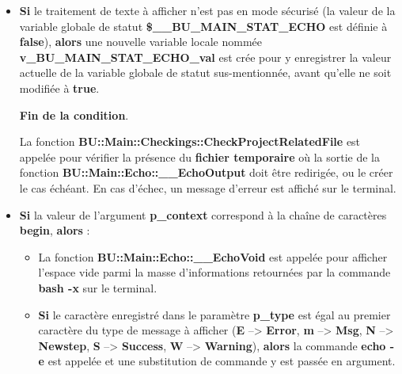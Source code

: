 \documentclass[a4paper,10pt]{article}
\begin{document}
\begin{itemize}
    \item
    {
        \begin{justify}
            \textbf{\color{brick}Si} le traitement de texte à afficher n'est pas en mode sécurisé (la valeur de la variable globale de statut \textbf{\color{orange}\$\_\_BU\_MAIN\_STAT\_ECHO} est définie à \textbf{false}), \textbf{\color{brick}alors} une nouvelle variable locale nommée \textbf{\color{orange}v\_BU\_MAIN\_STAT\_ECHO\_val} est crée pour y enregistrer la valeur actuelle de la variable globale de statut sus-mentionnée, avant qu'elle ne soit modifiée à \textbf{true}.
        \end{justify}\setlength{\parskip}{1em}

        \begin{justify}
            \textbf{\color{brick}Fin de la condition}.
        \end{justify}
    }

    \begin{justify}\setlength{\parskip}{2em}
        La fonction \textbf{\color{mauve}BU::Main::Checkings::CheckProjectRelatedFile} est appelée pour vérifier la présence du \textbf{\color{lime}fichier temporaire} où la sortie de la fonction \textbf{\color{mauve}BU::Main::Echo::\_\_EchoOutput} doit être redirigée, ou le créer le cas échéant. En cas d'échec, un message d'erreur est affiché sur le terminal.
    \end{justify}

    \item
    {
        \begin{justify}\setlength{\parskip}{2em}
            \textbf{\color{brick}Si} la valeur de l'argument \textbf{\color{orange}p\_context} correspond à la chaîne de caractères \textbf{begin}, \textbf{\color{brick}alors} :
        \end{justify}\setlength{\parskip}{1em}

        \begin{itemize}
            \item
            {
                \begin{justify}
                    La fonction \textbf{\color{mauve}BU::Main::Echo::\_\_EchoVoid} est appelée pour afficher l'espace vide parmi la masse d'informations retournées par la commande \textbf{\color{gray}bash -x} sur le terminal.
                \end{justify}
            }

            \item
            {
                \begin{justify}\setlength{\parskip}{2em}
                    \textbf{\color{brick}Si} le caractère enregistré dans le paramètre \textbf{\color{orange}p\_type} est égal au premier caractère du type de message à afficher (\textbf{E} --> \textbf{Error}, \textbf{m} --> \textbf{Msg}, \textbf{N} --> \textbf{Newstep}, \textbf{S} --> \textbf{Success}, \textbf{W} --> \textbf{Warning}), \textbf{\color{brick}alors} la commande \textbf{\color{gray}echo -e} est appelée et une substitution de commande y est passée en argument.
                \end{justify}\setlength{\parskip}{1em}

}
\end{itemize}}
\end{itemize}
\end{document}
